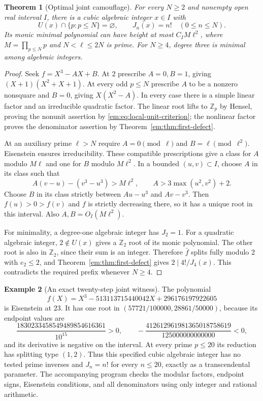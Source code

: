\documentclass[11pt,a4paper]{article}
\newtheorem{theorem}{Theorem}[section]
\theoremstyle{definition}
\newtheorem{example}[theorem]{Example}
\theoremstyle{remark}
\theoremstyle{plain}
\numberwithin{equation}{section}
\begin{document}
\begin{theorem}[Optimal joint camouflage]\label{em:thm:joint-camouflage}
For every $N\ge2$ and nonempty open real interval $I$, there is a
cubic algebraic integer $x\in I$ with
\[
 U(x)\cap\{p:p\le N\}=\varnothing,
 \qquad J_n(x)=n!\quad(0\le n\le N).
\]
Its monic minimal polynomial can have height at most $C_I M\ell^2$,
where $M=\prod_{p\le N}p$ and $N<\ell\le2N$ is prime.
For $N\ge4$, degree three is minimal among algebraic integers.
\end{theorem}
\begin{proof}
Seek $f=X^3-AX+B$.  At $2$ prescribe $A=0,B=1$, giving
$(X+1)(X^2+X+1)$.  At every odd $p\le N$ prescribe $A$ to be a
nonzero nonsquare and $B=0$, giving $X(X^2-A)$.  In every case
there is a simple linear factor and an irreducible quadratic factor.
The linear root lifts to $\mathbb Z_p$ by Hensel, proving the
nonunit assertion by \eqref{em:eq:local-unit-criterion}; the nonlinear
factor proves the denominator assertion by Theorem~\ref{em:thm:first-defect}.

At an auxiliary prime $\ell>N$ require $A=0\pmod\ell$ and
$B=\ell\pmod{\ell^2}$.  Eisenstein ensures irreducibility.
These compatible prescriptions give a class for $A$ modulo $M\ell$
and one for $B$ modulo $M\ell^2$.  In a bounded $(u,v)\subset I$,
choose $A$ in its class such that
\[
 A(v-u)-(v^3-u^3)>M\ell^2,
 \qquad A>3\max(u^2,v^2)+2.
\]
Choose $B$ in its class strictly between $Au-u^3$ and $Av-v^3$.
Then $f(u)>0>f(v)$ and $f$ is strictly decreasing there, so it has a
unique root in this interval.  Also $A,B=O_I(M\ell^2)$.

For minimality, a degree-one algebraic integer has $J_2=1$.
For a quadratic algebraic integer, $2\notin U(x)$ gives a
$\mathbb Z_2$ root of its monic polynomial.  The other root is
also in $\mathbb Z_2$, since their sum is an integer.  Therefore
$\bar f$ splits fully modulo $2$ with $e_2\le2$, and
Theorem~\ref{em:thm:first-defect} gives $2\mid4!/J_4(x)$.
This contradicts the required prefix whenever $N\ge4$.
\end{proof}

\begin{example}[An exact twenty-step joint witness]\label{em:joint-witness}
The polynomial
\[
 f(X)=X^3-513113715440042X+296176197922605
\]
is Eisenstein at $23$.  It has one root in
$(57721/100000,28861/50000)$, because its endpoint values are
\[
 \frac{1830233458549489854616361}{10^{15}}>0,
 \qquad
 -\frac{412612961981365018758619}{125000000000000}<0,
\]
and its derivative is negative on the interval.  At every prime
$p\le20$ its reduction has splitting type $(1,2)$.  Thus this
specified cubic algebraic integer has no tested prime inverses and
$J_n=n!$ for every $n\le20$, exactly as a transcendental parameter.
The accompanying program checks the modular factors, endpoint signs,
Eisenstein conditions, and all denominators using only integer and
rational arithmetic.
\end{example}
\end{document}
